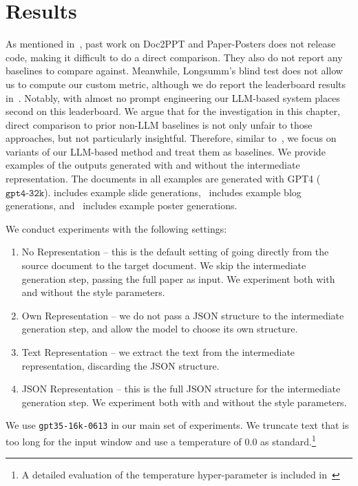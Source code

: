 
\section{Results}
As mentioned in~, past work on Doc2PPT and Paper-Posters does not release code, making it difficult to do a direct comparison. They also do not report any baselines to compare against. Meanwhile, Longsumm's blind test does not allow us to compute our custom metric, although we do report the leaderboard results in~. Notably, with almost no prompt engineering our LLM-based system places second on this leaderboard. We argue that for the investigation in this chapter, direct comparison to prior non-LLM baselines is not only unfair to those approaches, but not particularly insightful.
Therefore, similar to~\textcite{Wei2022ChainOT}, we focus on variants of our LLM-based method and treat them as baselines. We provide examples of the outputs generated with and without the intermediate representation. The documents in all examples are generated with GPT4 ($\texttt{gpt4-32k}$).  includes example slide generations,~ includes example blog generations, and~ includes example poster generations. 


We conduct experiments with the following settings:
\begin{enumerate}[label={(\arabic*)}]
    \item No Representation -- this is the default setting of going directly from the source document to the target document. We skip the intermediate generation step, passing the full paper as input. We experiment both with and without the style parameters. 
    \item Own Representation -- we do not pass a JSON structure to the intermediate generation step, and allow the model to choose its own structure.
    \item Text Representation -- we extract the text from the intermediate representation, discarding the JSON structure.
    \item JSON Representation -- this is the full JSON structure for the intermediate generation step. We experiment both with and without the style parameters.
\end{enumerate}

We use \texttt{gpt35-16k-0613} in our main set of experiments. We truncate text that is too long for the input window and use a temperature of 0.0 as standard.\footnote{A detailed evaluation of the temperature hyper-parameter is included in~}

